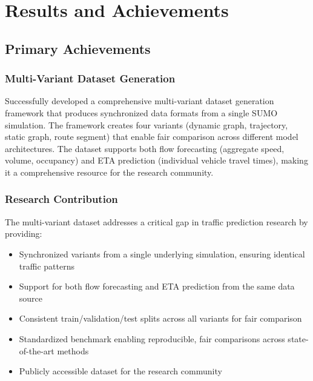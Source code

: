 \section{Results and Achievements}

\subsection{Primary Achievements}

\subsubsection{Multi-Variant Dataset Generation}
Successfully developed a comprehensive multi-variant dataset generation framework that produces synchronized data formats from a single SUMO simulation. The framework creates four variants (dynamic graph, trajectory, static graph, route segment) that enable fair comparison across different model architectures. The dataset supports both flow forecasting (aggregate speed, volume, occupancy) and ETA prediction (individual vehicle travel times), making it a comprehensive resource for the research community.

\subsubsection{Research Contribution}
The multi-variant dataset addresses a critical gap in traffic prediction research by providing:
\begin{itemize}
    \item Synchronized variants from a single underlying simulation, ensuring identical traffic patterns
    \item Support for both flow forecasting and ETA prediction from the same data source
    \item Consistent train/validation/test splits across all variants for fair comparison
    \item Standardized benchmark enabling reproducible, fair comparisons across state-of-the-art methods
    \item Publicly accessible dataset for the research community
\end{itemize}


